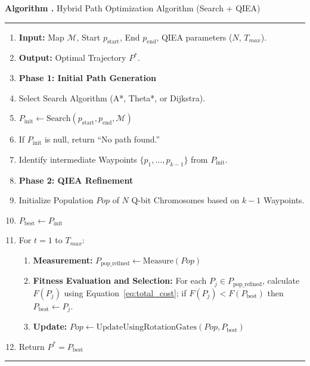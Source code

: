 \begin{center}
\begin{minipage}{0.9\textwidth}
\centering
\small{}\label{alg:hybrid_qiea}\textbf{Algorithm \thealgorithm.} Hybrid Path Optimization Algorithm (Search + QIEA)
\par\medskip\hrule
\begin{enumerate}
\item \textbf{Input:} Map $\mathcal{M}$, Start $p_{\text{start}}$, End $p_{\text{end}}$, QIEA parameters ($N$, $T_{max}$).
\item \textbf{Output:} Optimal Trajectory $P^{*}$.
\item \textbf{Phase 1: Initial Path Generation}
\item Select Search Algorithm (A*, Theta*, or Dijkstra).
\item $P_{\text{init}} \gets \text{Search}(p_{\text{start}}, p_{\text{end}}, \mathcal{M})$
\item If $P_{\text{init}}$ is null, return ``No path found.''
\item Identify intermediate Waypoints $\{p_1, \ldots, p_{k-1}\}$ from $P_{\text{init}}$.
\item \textbf{Phase 2: QIEA Refinement}
\item Initialize Population $Pop$ of $N$ Q-bit Chromosomes based on $k-1$ Waypoints.
\item $P_{\text{best}} \gets P_{\text{init}}$
\item For $t = 1$ to $T_{max}$:
\begin{enumerate}
\item \textbf{Measurement:} $P_{\text{pop\_refined}} \gets \text{Measure}(Pop)$
\item \textbf{Fitness Evaluation and Selection:} For each $P_{j} \in P_{\text{pop\_refined}}$, calculate $F(P_{j})$ using Equation~\eqref{eq:total_cost}; if $F(P_{j}) < F(P_{\text{best}})$ then $P_{\text{best}} \gets P_{j}$.
\item \textbf{Update:} $Pop \gets \text{UpdateUsingRotationGates}(Pop, P_{\text{best}})$
\end{enumerate}
\item Return $P^* = P_{\text{best}}$
\end{enumerate}
\par\smallskip\hrule
\end{minipage}
\end{center}

